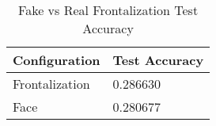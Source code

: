 \begin{table}[H] \centering

\makeatletter
\def\rulecolor#1#{\CT@arc{#1}}
\def\CT@arc#1#2{%
\ifdim\baselineskip=\z@\noalign\fi
{\gdef\CT@arc@{\color#1{#2}}}}
\let\CT@arc@\relax
{}
\makeatother

\begin{tabular}{@{}l|l@{}}
	\toprule
    Configuration & Test Accuracy \\
    
    \midrule
    Frontalization & 0.286630 \\
    Face & 0.280677 \\
    
    \bottomrule
\end{tabular}
    
	\caption{Fake vs Real Frontalization Test Accuracy} 
    \label{table:fake-fakereal_frontal}

\end{table}
